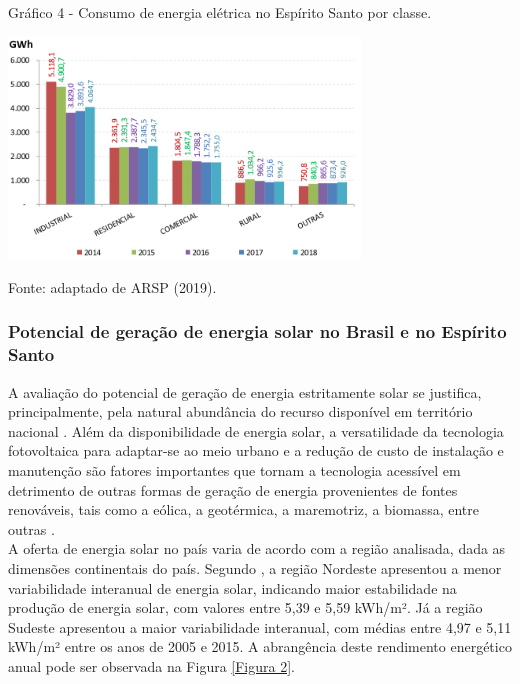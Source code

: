 \begin{onehalfspace}
        \begin{graph}
            \par \small Gráfico 4 - Consumo de energia elétrica no Espírito Santo por classe.
            \begin{minipage}[ht]{1\textwidth}\centering
                \includegraphics[width=0.7\textwidth]{graphs/graph3_consumo_de_energia_eletrica_no_es_por_classe-arsp_2019.png}
            \end{minipage}
            \begin{flushleft}
                \par \small Fonte: adaptado de ARSP (2019).
            \end{flushleft}
        \end{graph}

    \subsubsection{Potencial de geração de energia solar no Brasil e no Espírito Santo}
    A avaliação do potencial de geração de energia estritamente solar se justifica, principalmente, 
    pela natural abundância do recurso disponível em território nacional \cite{Pereira2017}. Além 
    da disponibilidade de energia solar, a versatilidade da tecnologia fotovoltaica para adaptar-se 
    ao meio urbano e a redução de custo de instalação e manutenção são fatores importantes que 
    tornam a tecnologia acessível em detrimento de outras formas de geração de energia provenientes 
    de fontes renováveis, tais como a eólica, a geotérmica, a maremotriz, a biomassa, entre outras 
    \cite{AgenciadeRegulacaodeServicosPublicosdoEspiritoSanto-ARSP2019,Didone2014,Didone2014a,InternationalEnergyAgency-IEA2019b,UnitedNationsEnvironmentProgramme-UNEP2019}.\vspace{0.3cm} \\
    A oferta de energia solar no país varia de acordo com a região analisada, dada as dimensões 
    continentais do país. Segundo \textcite{Pereira2017}, a região Nordeste apresentou a menor 
    variabilidade interanual de energia solar, indicando maior estabilidade na produção de energia 
    solar, com valores entre 5,39 e 5,59 kWh/m². Já a região Sudeste apresentou a maior variabilidade 
    interanual, com médias entre 4,97 e 5,11 kWh/m² entre os anos de 2005 e 2015. A abrangência deste 
    rendimento energético anual pode ser observada na Figura \ref{Figura 2}.\pagebreak
    

\end{onehalfspace}
